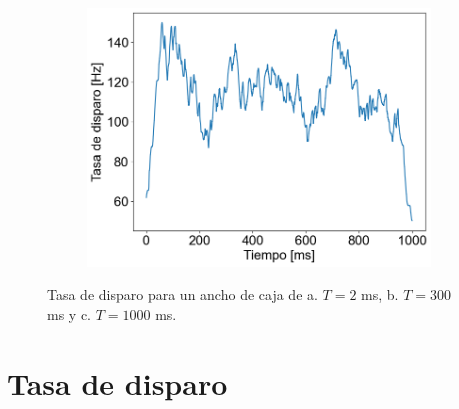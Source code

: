 \documentclass[aps,prb,twocolumn,superscriptaddress,floatfix,longbibliography]{revtex4-2}
\newcounter{para}
\begin{document}
\begin{figure}[h]
\begin{subfigure}[b]{0.35\textwidth}
      \includegraphics[width=\textwidth]{tasa_de_disparo_1000.png}
      \caption{\label{fig:tasa_de_disparo_1000}}
  \end{subfigure}
     \caption{Tasa de disparo para un ancho de caja de a. $T = 2$ ms, b. $T = 300$ ms y c. $T = 1000$ ms.}
     \label{fig:tasa_de_disparo}
\end{figure}

\section{Tasa de disparo}
\end{document}
